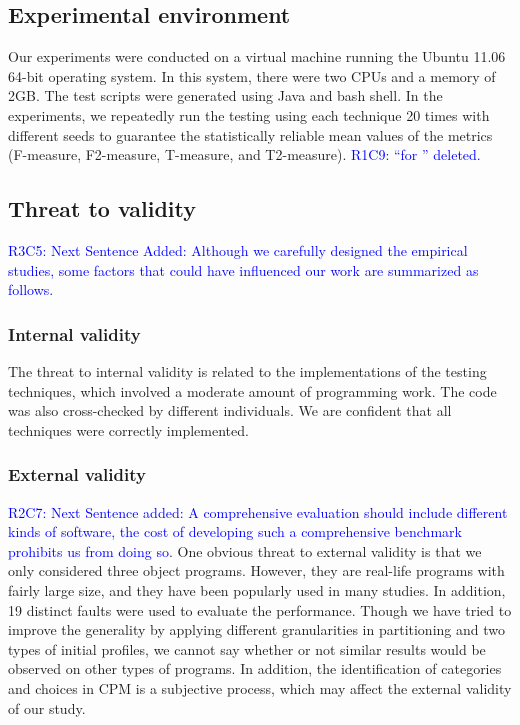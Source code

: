 \documentclass[10pt,journal,compsoc]{IEEEtran}
\begin{document}
\subsection{Experimental environment}

Our experiments were conducted on a virtual machine running the Ubuntu 11.06 64-bit operating system. In this system, there were two CPUs and a memory of 2GB. The test scripts were generated using Java and bash shell. In the experiments, we repeatedly run the testing using each technique 20 times with different seeds to guarantee the statistically reliable mean values of the metrics (F-measure, F2-measure, T-measure, and T2-measure).  \textcolor{blue}{R1C9: ``for '' deleted.}

\subsection{Threat to validity}

\textcolor{blue}{R3C5: Next Sentence Added:
Although we carefully designed the empirical studies, some factors that could have influenced our work are summarized as follows.}

\subsubsection{Internal validity}
The threat to internal validity is related to the implementations of the testing techniques, which involved a moderate amount of programming work. The code was also cross-checked by different individuals. We are confident that all techniques were correctly implemented.

\subsubsection{External validity}
\textcolor{blue}{R2C7: Next Sentence added: A comprehensive evaluation should include different kinds of software, the cost of developing such a comprehensive benchmark prohibits us from doing so}. One obvious threat to external validity is that we only considered three object programs. However, they are real-life programs with fairly large size, and they have been popularly used in many studies. In addition, 19 distinct faults were used to evaluate the performance. Though we have tried to improve the generality by applying different granularities in partitioning and two types of initial profiles, we cannot say whether or not similar results would be observed on other types of programs. In addition, the identification of categories and choices in CPM is a subjective process, which may affect the external validity of our study.
\end{document}
